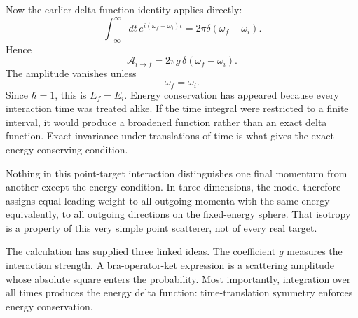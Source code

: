 Now the earlier delta-function identity applies directly:
\begin{equation}
\int_{-\infty}^{\infty}dt\,
e^{i(\omega_f-\omega_i)t}
=2\pi\delta(\omega_f-\omega_i).
\end{equation}
Hence
\begin{equation}
\boxed{
\mathcal A_{i\to f}
=2\pi g\,\delta(\omega_f-\omega_i)
}.
\end{equation}
The amplitude vanishes unless
\begin{equation}
\omega_f=\omega_i.
\end{equation}
Since \(\hbar=1\), this is \(E_f=E_i\). Energy conservation has appeared because every interaction time was treated alike. If the time integral were restricted to a finite interval, it would produce a broadened function rather than an exact delta function. Exact invariance under translations of time is what gives the exact energy-conserving condition.

\begin{classroomqa}
\end{classroomqa}


Nothing in this point-target interaction distinguishes one final momentum from another except the energy condition. In three dimensions, the model therefore assigns equal leading weight to all outgoing momenta with the same energy---equivalently, to all outgoing directions on the fixed-energy sphere. That isotropy is a property of this very simple point scatterer, not of every real target.

The calculation has supplied three linked ideas. The coefficient \(g\) measures the interaction strength. A bra-operator-ket expression is a scattering amplitude whose absolute square enters the probability. Most importantly, integration over all times produces the energy delta function: time-translation symmetry enforces energy conservation.

